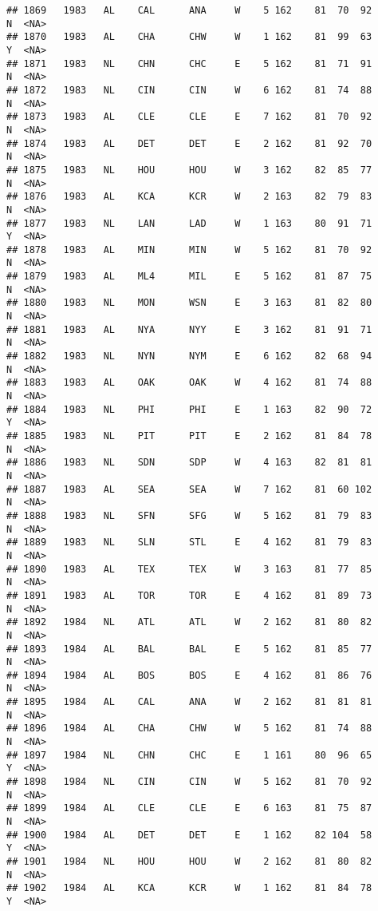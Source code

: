 \documentclass[]{article}
\begin{document}
\begin{verbatim}
## 1869   1983   AL    CAL      ANA     W    5 162    81  70  92      N  <NA>
## 1870   1983   AL    CHA      CHW     W    1 162    81  99  63      Y  <NA>
## 1871   1983   NL    CHN      CHC     E    5 162    81  71  91      N  <NA>
## 1872   1983   NL    CIN      CIN     W    6 162    81  74  88      N  <NA>
## 1873   1983   AL    CLE      CLE     E    7 162    81  70  92      N  <NA>
## 1874   1983   AL    DET      DET     E    2 162    81  92  70      N  <NA>
## 1875   1983   NL    HOU      HOU     W    3 162    82  85  77      N  <NA>
## 1876   1983   AL    KCA      KCR     W    2 163    82  79  83      N  <NA>
## 1877   1983   NL    LAN      LAD     W    1 163    80  91  71      Y  <NA>
## 1878   1983   AL    MIN      MIN     W    5 162    81  70  92      N  <NA>
## 1879   1983   AL    ML4      MIL     E    5 162    81  87  75      N  <NA>
## 1880   1983   NL    MON      WSN     E    3 163    81  82  80      N  <NA>
## 1881   1983   AL    NYA      NYY     E    3 162    81  91  71      N  <NA>
## 1882   1983   NL    NYN      NYM     E    6 162    82  68  94      N  <NA>
## 1883   1983   AL    OAK      OAK     W    4 162    81  74  88      N  <NA>
## 1884   1983   NL    PHI      PHI     E    1 163    82  90  72      Y  <NA>
## 1885   1983   NL    PIT      PIT     E    2 162    81  84  78      N  <NA>
## 1886   1983   NL    SDN      SDP     W    4 163    82  81  81      N  <NA>
## 1887   1983   AL    SEA      SEA     W    7 162    81  60 102      N  <NA>
## 1888   1983   NL    SFN      SFG     W    5 162    81  79  83      N  <NA>
## 1889   1983   NL    SLN      STL     E    4 162    81  79  83      N  <NA>
## 1890   1983   AL    TEX      TEX     W    3 163    81  77  85      N  <NA>
## 1891   1983   AL    TOR      TOR     E    4 162    81  89  73      N  <NA>
## 1892   1984   NL    ATL      ATL     W    2 162    81  80  82      N  <NA>
## 1893   1984   AL    BAL      BAL     E    5 162    81  85  77      N  <NA>
## 1894   1984   AL    BOS      BOS     E    4 162    81  86  76      N  <NA>
## 1895   1984   AL    CAL      ANA     W    2 162    81  81  81      N  <NA>
## 1896   1984   AL    CHA      CHW     W    5 162    81  74  88      N  <NA>
## 1897   1984   NL    CHN      CHC     E    1 161    80  96  65      Y  <NA>
## 1898   1984   NL    CIN      CIN     W    5 162    81  70  92      N  <NA>
## 1899   1984   AL    CLE      CLE     E    6 163    81  75  87      N  <NA>
## 1900   1984   AL    DET      DET     E    1 162    82 104  58      Y  <NA>
## 1901   1984   NL    HOU      HOU     W    2 162    81  80  82      N  <NA>
## 1902   1984   AL    KCA      KCR     W    1 162    81  84  78      Y  <NA>

\end{verbatim}
\end{document}
